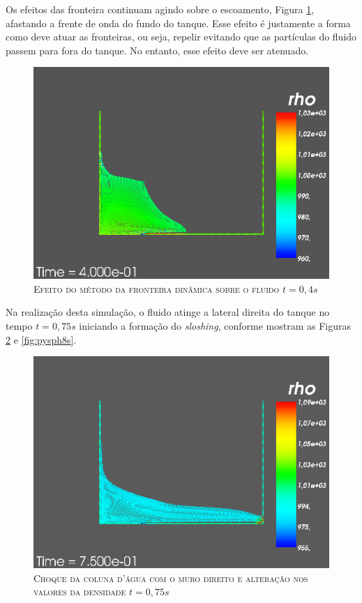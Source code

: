 Os efeitos das fronteira continuam agindo sobre o escoamento, Figura \ref{fig:pysph4s}, afastando a frente de onda do fundo do tanque. Esse efeito é justamente a forma como deve atuar as fronteiras, ou seja, repelir evitando que as partículas do fluido passem para fora do tanque. No entanto, esse efeito deve ser atenuado.  

\begin{figure}[H]
	\centering
	\includegraphics[scale=0.5]{figuras/pysph4s.png}
	\caption{\textsc{Efeito do método da fronteira dinâmica sobre o fluido $t=0,4s$}}
	\vspace{-0.1cm}
	\label{fig:pysph4s}
\end{figure}

Na realização desta simulação, o fluido atinge a lateral direita do tanque no tempo $t=0,75s$ iniciando a formação do \textit{sloshing}, conforme mostram as Figuras \ref{fig:pysph75s} e \ref{fig:pysph8s}.  

\begin{figure}[H]
	\centering
	\includegraphics[scale=0.5]{figuras/pysph75s.png}
	\caption{\textsc{Choque da coluna d'água com o muro direito e alteração nos valores da densidade $t=0,75s$}}
	\vspace{-0.1cm}
	\label{fig:pysph75s}
\end{figure}

